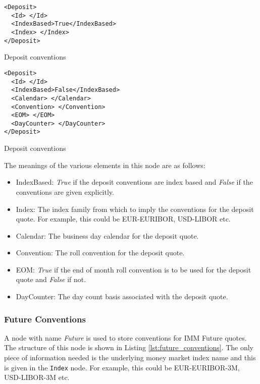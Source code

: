 \begin{listing}[H]
\begin{verbatim}
<Deposit>
  <Id> </Id>
  <IndexBased>True</IndexBased>
  <Index> </Index>
</Deposit>
\end{verbatim}
\caption{Deposit conventions}
\label{lst:deposit_conventions_index}
\end{listing}

\begin{listing}[H]
\begin{verbatim}
<Deposit>
  <Id> </Id>
  <IndexBased>False</IndexBased>
  <Calendar> </Calendar>
  <Convention> </Convention>
  <EOM> </EOM>
  <DayCounter> </DayCounter>
</Deposit>
\end{verbatim}
\caption{Deposit conventions}
\label{lst:deposit_conventions_explicit}
\end{listing}


The meanings of the various elements in this node are as follows:
\begin{itemize}
\item IndexBased: \emph{True} if the deposit conventions are index based and \emph{False} if the conventions are given
explicitly.
\item Index: The index family from which to imply the conventions for the deposit quote. For example, this could be
EUR-EURIBOR, USD-LIBOR etc.
\item Calendar: The business day calendar for the deposit quote.
\item Convention: The roll convention for the deposit quote.
\item EOM: \emph{True} if the end of month roll convention is to be used for the deposit quote and \emph{False} if not.
\item DayCounter: The day count basis associated with the deposit quote.
\end{itemize}

\subsubsection{Future Conventions}
A node with name \emph{Future} is used to store conventions for IMM Future quotes. The structure of this node is shown
in Listing \ref{lst:future_conventions}. The only piece of information needed is the underlying money market index name
and this is given in the \lstinline!Index! node. For example, this could be EUR-EURIBOR-3M, USD-LIBOR-3M etc.

